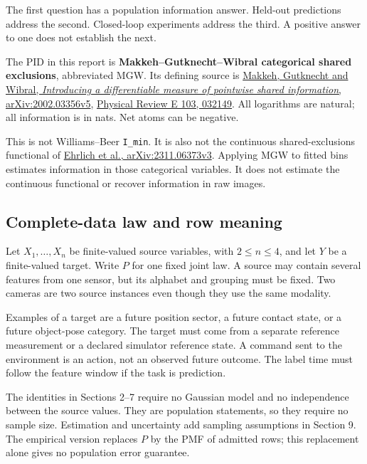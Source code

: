 \documentclass[11pt,a4paper]{article}
\let\PidSavedTexttt\texttt
\renewcommand{\texttt}[1]{\PidSavedTexttt{#1}}
\begin{document}
The first question has a population information answer. Held-out predictions address the second. Closed-loop experiments address the third. A positive answer to one does not establish the next.

The PID in this report is \textbf{Makkeh--Gutknecht--Wibral categorical shared exclusions}, abbreviated MGW. Its defining source is \href{https://arxiv.org/abs/2002.03356v5}{Makkeh, Gutknecht and Wibral, \emph{Introducing a differentiable measure of pointwise shared information}, arXiv:2002.03356v5}, \href{https://doi.org/10.1103/PhysRevE.103.032149}{Physical Review E 103, 032149}. All logarithms are natural; all information is in nats. Net atoms can be negative.

This is not Williams--Beer \texttt{I\_\allowbreak{}min}. It is also not the continuous shared-exclusions functional of \href{https://arxiv.org/abs/2311.06373v3}{Ehrlich et al., arXiv:2311.06373v3}. Applying MGW to fitted bins estimates information in those categorical variables. It does not estimate the continuous functional or recover information in raw images.

\par{}

\subsection{Complete-data law and row meaning}\label{complete-data-law-and-row-meaning}

Let \(X_1,\ldots,X_n\) be finite-valued source variables, with \(2\leq n\leq4\), and let \(Y\) be a finite-valued target. Write \(P\) for one fixed joint law. A source may contain several features from one sensor, but its alphabet and grouping must be fixed. Two cameras are two source instances even though they use the same modality.

Examples of a target are a future position sector, a future contact state, or a future object-pose category. The target must come from a separate reference measurement or a declared simulator reference state. A command sent to the environment is an action, not an observed future outcome. The label time must follow the feature window if the task is prediction.

The identities in Sections 2--7 require no Gaussian model and no independence between the source values. They are population statements, so they require no sample size. Estimation and uncertainty add sampling assumptions in Section 9. The empirical version replaces \(P\) by the PMF of admitted rows; this replacement alone gives no population error guarantee.
\end{document}
